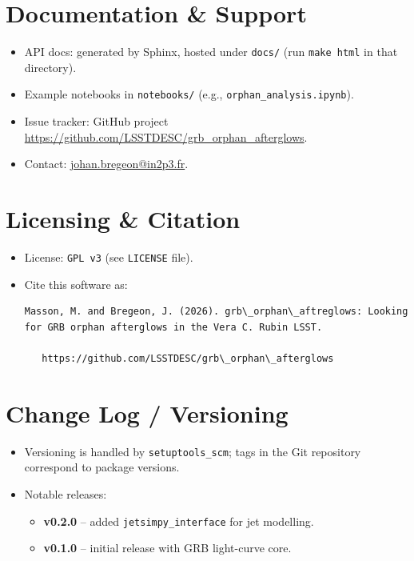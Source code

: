 \documentclass{article}
\begin{document}
\section*{Documentation \& Support}
\begin{itemize}
  \item API docs: generated by Sphinx, hosted under \texttt{docs/} (run \texttt{make html} in that directory).
  \item Example notebooks in \texttt{notebooks/} (e.g., \texttt{orphan\_analysis.ipynb}).
  \item Issue tracker: GitHub project \url{https://github.com/LSSTDESC/grb\_orphan\_afterglows}.
  \item Contact: \href{mailto:johan.bregeon@in2p3.fr}{johan.bregeon@in2p3.fr}.
\end{itemize}

\section*{Licensing \& Citation}
\begin{itemize}
	\item License: \texttt{GPL v3} (see \texttt{LICENSE} file).
  \item Cite this software as:
\begin{verbatim}
Masson, M. and Bregeon, J. (2026). grb\_orphan\_aftreglows: Looking for GRB orphan afterglows in the Vera C. Rubin LSST.

   https://github.com/LSSTDESC/grb\_orphan\_afterglows 
\end{verbatim}
\end{itemize}

\section*{Change Log / Versioning}
\begin{itemize}
  \item Versioning is handled by \texttt{setuptools\_scm}; tags in the Git repository correspond to package versions.
  \item Notable releases:
    \begin{itemize}
      \item \textbf{v0.2.0} – added \texttt{jetsimpy\_interface} for jet modelling.
      \item \textbf{v0.1.0} – initial release with GRB light-curve core.
    \end{itemize}
\end{itemize}
\end{document}
